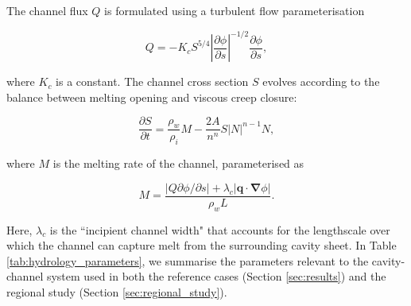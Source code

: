 \documentclass[draft]{agujournal2019}
\newcommand{\Grad}{\boldsymbol{\nabla}}
\newcommand{\pdiff}[2]{\frac{\partial{#1}}{\partial{#2}}}
\newcommand{\secref}[1]{Section \ref{#1}}
\newcommand{\tabref}[1]{Table \ref{#1}}
\begin{document}
The channel flux $Q$ is formulated using a turbulent flow parameterisation
\begin{linenomath*}
\begin{equation}
    Q = -K_c S^{5/4}\left|\pdiff{\phi}{s}\right|^{-1/2}\pdiff{\phi}{s},
\end{equation}
\end{linenomath*}
where $K_c$ is a constant. The channel cross section $S$ evolves according to the balance between melting opening and viscous creep closure:
\begin{linenomath*}
\begin{equation}
    \pdiff{S}{t} = \frac{\rho_w}{\rho_i}M - \frac{2 A}{n^n}S|N|^{n-1}N,
\end{equation}
\end{linenomath*}
where $M$ is the melting rate of the channel, parameterised as
\begin{linenomath*}
\begin{equation}\label{eq:channel_melting}
    M = \frac{\left|Q \partial\phi/\partial s\right| + \lambda_c\left|\boldsymbol{q}\cdot\Grad\phi\right|}{\rho_w L}.
\end{equation}
\end{linenomath*}
Here, $\lambda_c$ is the ``incipient channel width" \cite{hewitt2013Seasonal} that accounts for the lengthscale over which the channel can capture melt from the surrounding cavity sheet. In \tabref{tab:hydrology_parameters}, we summarise the parameters relevant to the cavity-channel system used in both the reference cases (\secref{sec:results}) and the regional study (\secref{sec:regional_study}).
\end{document}
